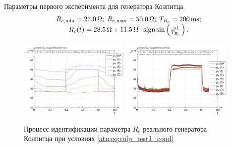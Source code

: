 
Параметры первого эксперимента для генератора Колпитца
%
\begin{equation}
  \begin{array}{c}
    R_{c,\min} = \SI{27.0}{\ohm};
    \;
    R_{c,\max} = \SI{50.0}{\ohm};
    \;
    T_{R_c} = \SI{200}{\milli\second};
  \\
    R_c(t) = \SI{28.5}{\ohm} + \SI{11.5}{\ohm} \cdot \operatorname*{sign} \sin \left(  \frac{\pi t}{T_{R_c}}  \right).
  \end{array}
  \label{atu:eq:colp_test1_cond}
\end{equation}

\begin{figure}[htb!]
  \centerline{
    \includegraphics[width=0.48\textwidth]{p/r/colp_real_id-p_t_pi_ql3rlWvnAAW_real_d_0.png}
    \hfill
    \includegraphics[width=0.48\textwidth]{p/r/colp_real_id-p_t_p_ql3rlWvnAAW_real_d_0.png}
  }
  \caption{Процесс идентификации параметра $R_c$ реального генератора Колпитца при условиях \ref{atu:eq:colp_test1_cond} }
  \label{atu:f:colp_r_id_1}
\end{figure}


